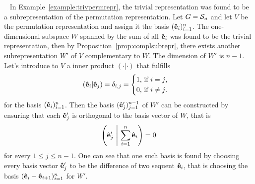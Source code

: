 \begin{example}~\label{example:comptrivpermrepr}
	In Example~\ref{example:trivpermrepr}, the trivial representation was found to be a subrepresentation of the permutation representation. Let $G= \mathcal{S}_n$ and let $V$ be the permutation representation and assign it the basis $(\mathbf{\hat{e}}_i)_{i=1}^n$. The one-dimensional subspace $W$ spanned by the sum of all $\mathbf{\hat{e}}_i$ was found to be the trivial representation, then by Proposition~\ref{prop:complsubrepr}, there exists another subrepresentation $W'$ of $V$ complementary to $W$. The dimension of $W'$ is $n-1$. Let's introduce to $V$ a inner product $(\cdot|\cdot)$ that fulfills
	\begin{align*}
		(\mathbf{\hat{e}}_i|\mathbf{\hat{e}}_j) = \delta_{i,j} = \begin{cases}
			1 \text{, if $i=j$,}\\
			0 \text{, if $i \neq j$.}
		\end{cases}
	\end{align*}
	for the basis $(\mathbf{\hat{e}}_i)_{i=1}^n$. Then the basis $(\mathbf{\hat{e}}'_j)_{j=1}^{n-1}$ of $W'$ can be constructed by ensuring that each $\mathbf{\hat{e}}'_j$ is orthogonal to the basis vector of $W$, that is
	\begin{align*}
		\left( \mathbf{\hat{e}}'_j \ \middle\vert \ \sum_{i=1}^n \mathbf{\hat{e}}_i \right) = 0
	\end{align*}
	for every $1 \leq j \leq n-1$. One can see that one such basis is found by choosing every basis vector $\mathbf{\hat{e}}'_j$ to be the difference of two sequent $\mathbf{\hat{e}}_i$, that is choosing the basis $(\mathbf{\hat{e}}_i - \mathbf{\hat{e}}_{i+1})_{i=1}^n$ for $W'$.
\end{example}
